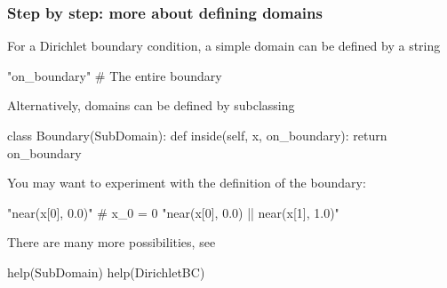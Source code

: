 \begin{frame}[fragile, shrink=5]
  \frametitle{Step by step: more about defining domains}
  For a Dirichlet boundary condition, a simple domain can be defined
  by a string
  \vspace{-1em}
  \begin{python}
"on_boundary" # The entire boundary
  \end{python}

  Alternatively, domains can be defined by subclassing 
  \vspace{-1em}
  \begin{python}
class Boundary(SubDomain):
    def inside(self, x, on_boundary):
        return on_boundary
  \end{python}

  You may want to experiment with the definition of the boundary:
  \vspace{-1em}
  \begin{python}
"near(x[0], 0.0)" # x_0 = 0
"near(x[0], 0.0) || near(x[1], 1.0)"
  \end{python}

  There are many more possibilities, see
  \vspace{-1em}
  \begin{python}
help(SubDomain)
help(DirichletBC)
  \end{python}

\end{frame}
